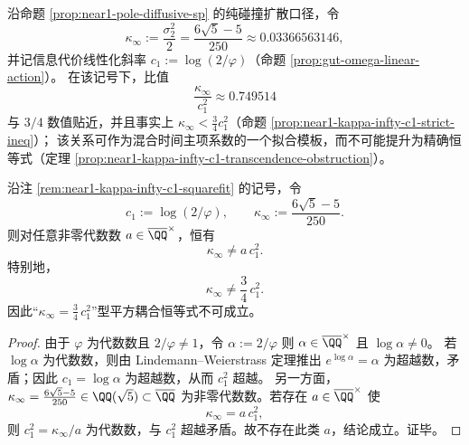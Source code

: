 \begin{remark}[远距常数的平方拟合：信息代价斜率 \texorpdfstring{$c_1=\log(2/\varphi)$}{c1=log(2/phi)} 与扩散常数 \texorpdfstring{$\kappa_\infty$}{kappa_infty}]\label{rem:near1-kappa-infty-c1-squarefit}
沿命题 \ref{prop:near1-pole-diffusive-sp} 的纯碰撞扩散口径，令
\[
\kappa_\infty:=\frac{\sigma_2^2}{2}=\frac{6\sqrt5-5}{250}\approx 0.03366563146,
\]
并记信息代价线性化斜率 \(c_1:=\log(2/\varphi)\)（命题 \ref{prop:gut-omega-linear-action}）。
在该记号下，比值
\[
\frac{\kappa_\infty}{c_1^2}\approx 0.749514
\]
与 \(3/4\) 数值贴近，并且事实上 \(\kappa_\infty<\tfrac34 c_1^2\)（命题 \ref{prop:near1-kappa-infty-c1-strict-ineq}）；
该关系可作为混合时间主项系数的一个拟合模板，而不可能提升为精确恒等式（定理 \ref{prop:near1-kappa-infty-c1-transcendence-obstruction}）。
\end{remark}

\begin{theorem}\label{prop:near1-kappa-infty-c1-transcendence-obstruction}
沿注 \ref{rem:near1-kappa-infty-c1-squarefit} 的记号，令
\[
c_1:=\log(2/\varphi),\qquad
\kappa_\infty:=\frac{6\sqrt5-5}{250}.
\]
则对任意非零代数数 \(a\in\overline{\QQ}^{\times}\)，恒有
\[
\kappa_\infty\neq a\,c_1^2.
\]
特别地，
\[
\kappa_\infty\neq \frac34\,c_1^2.
\]
因此“\(\kappa_\infty=\frac34\,c_1^2\)”型平方耦合恒等式不可成立。
\end{theorem}
\begin{proof}
由于 \(\varphi\) 为代数数且 \(2/\varphi\neq 1\)，令 \(\alpha:=2/\varphi\) 则 \(\alpha\in\overline{\QQ}^\times\) 且 \(\log\alpha\neq 0\)。
若 \(\log\alpha\) 为代数数，则由 Lindemann--Weierstrass 定理推出 \(e^{\log\alpha}=\alpha\) 为超越数，矛盾；因此 \(c_1=\log\alpha\) 为超越数，从而 \(c_1^2\) 超越。
另一方面，\(\kappa_\infty=\frac{6\sqrt5-5}{250}\in\QQ(\sqrt5)\subset\overline{\QQ}\) 为非零代数数。若存在 \(a\in\overline{\QQ}^{\times}\) 使
\[
\kappa_\infty=a\,c_1^2,
\]
则 \(c_1^2=\kappa_\infty/a\) 为代数数，与 \(c_1^2\) 超越矛盾。故不存在此类 \(a\)，结论成立。证毕。\cite{Baker1975TranscendentalNumberTheory}
\end{proof}

